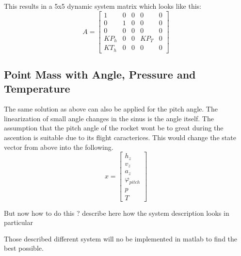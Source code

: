  This results in a 5x5 dynamic system matrix which looks like this:
  $$ A = \begin{bmatrix}
         1    & 0 & 0 & 0    & 0 \\
         0    & 1 & 0 & 0    & 0 \\
         0    & 0 & 0 & 0    & 0 \\
         KP_h & 0 & 0 & KP_T & 0 \\
         KT_h & 0 & 0 & 0    & 0 
        \end{bmatrix} $$
  
  \subsection{Point Mass with Angle, Pressure and Temperature}
  The same solution as above can also be applied for the pitch angle. The linearization of small angle changes in the sinus is the angle itself.
  The assumption that the pitch angle of the rocket wont be to great during the ascention is suitable due to its flight caracterices.
  This would change the state vector from above into the following.
      $$ x = \begin{bmatrix}
  h_z\\
  v_z\\
  a_z\\
  \varphi_{pitch}\\
  p\\
  T
  \end{bmatrix} $$
  
  But now how to do this ?
  describe here how the system description looks in particular 
  
  
  Those described different system will no be implemented in matlab to find the best possible.

